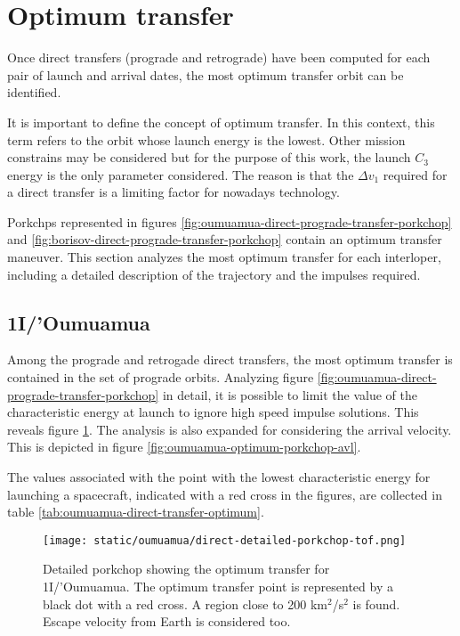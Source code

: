 \section{Optimum transfer}
\label{sec:optimum-transfer}

Once direct transfers (prograde and retrograde) have been computed for each pair
of launch and arrival dates, the most optimum transfer orbit can be identified.

It is important to define the concept of optimum transfer. In this context, this
term refers to the orbit whose launch energy is the lowest. Other mission
constrains may be considered but for the purpose of this work, the launch $C_3$
energy is the only parameter considered. The reason is that the $\Delta v_1$
required for a direct transfer is a limiting factor for nowadays technology.

Porkchps represented in figures
\ref{fig:oumuamua-direct-prograde-transfer-porkchop} and
\ref{fig:borisov-direct-prograde-transfer-porkchop} contain an optimum transfer
maneuver. This section analyzes the most optimum transfer for each interloper,
including a detailed description of the trajectory and the impulses required.

\subsection{1I/'Oumuamua}

Among the prograde and retrogade direct transfers, the most optimum transfer is
contained in the set of prograde orbits. Analyzing figure
\ref{fig:oumuamua-direct-prograde-transfer-porkchop} in detail, it is possible
to limit the value of the characteristic energy at launch to ignore high speed
impulse solutions. This reveals figure \ref{fig:oumuamua-optimum-porkchop}. The
analysis is also expanded for considering the arrival velocity. This is depicted
in figure \ref{fig:oumuamua-optimum-porkchop-avl}.

The values associated with the point with the lowest characteristic energy for
launching a spacecraft, indicated with a red cross in the figures, are collected
in table \ref{tab:oumuamua-direct-transfer-optimum}.

\begin{figure}[H]
  \centering
  \texttt{[image: static/oumuamua/direct-detailed-porkchop-tof.png]}
  \caption[Detailed porkchop showing the optimum transfer for
    1I/'Oumuamua with the time of flight.]{Detailed porkchop showing the optimum transfer for
    1I/'Oumuamua. The optimum transfer point is represented by a black dot
    with a red cross. A region close to 200 km$^2$/s$^2$ is found. Escape
    velocity from Earth is considered too.
  }
  \label{fig:oumuamua-optimum-porkchop}
\end{figure}

